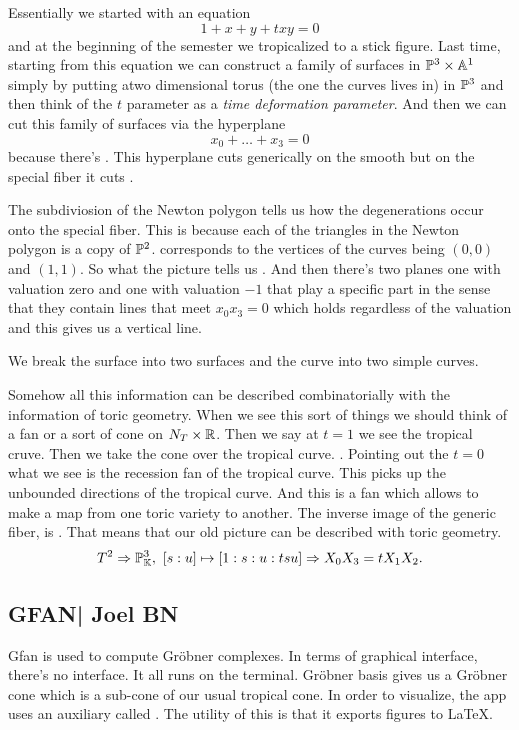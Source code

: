 \documentclass[12pt]{memoir}
\begin{document}
Essentially we started with an equation 
$$1+x+y+txy=0$$
and at the beginning of the semester we tropicalized to a stick figure. Last time, starting from this equation we can construct a family of surfaces in $\mathbb{P}^3\times\mathbb{A}^1$ simply by putting atwo dimensional torus (the one the curves lives in) in $\mathbb{P}^3$ and then think of the $t$ parameter as a \emph{time deformation parameter}.  And then we can cut this family of surfaces via the hyperplane 
$$x_0+\dots+x_3=0$$
because there's . This hyperplane cuts generically on the smooth but on the special fiber it cuts .\par 
The subdiviosion of the Newton polygon tells us how the degenerations occur onto the special fiber. This is because each of the triangles in the Newton polygon is a copy of $\mathbb{P}^2$.  corresponds to the vertices of the curves being $(0,0)$ and $(1,1)$. So what the picture tells us . And then there's two planes one with valuation zero and one with valuation $-1$ that play a specific part in the sense that they contain lines that meet $x_0x_3=0$ which holds regardless of the valuation and this gives us a vertical line.\par 
We break the surface into two surfaces and the curve into two simple curves.\par 
Somehow all this information can be described combinatorially with the information of toric geometry. When we see this sort of things we should think of a fan or a sort of cone on $N_T\times\mathbb{R}$. Then we say at $t=1$ we see the tropical cruve. Then we take the cone over the tropical curve. . Pointing out the $t=0$ what we see is the recession fan of the tropical curve. This picks up the unbounded directions of the tropical curve. And this is a fan which allows to make a map from one toric variety to another. The inverse image of the generic fiber, is . That means that our old picture can be described with toric geometry. 
$$T^2\Rightarrow\mathbb{P}^3_{\mathbb{K}},\ [s:u]\mapsto[1:s:u:tsu] \Rightarrow X_0X_3=tX_1X_2.$$

\subsection{GFAN| Joel BN}

Gfan is used to compute Gr\"obner complexes. In terms of graphical interface, there's no interface. It all runs on the terminal. Gr\"obner basis gives us a Gr\"obner cone which is a sub-cone of our usual tropical cone. In order to visualize, the app uses an auxiliary called . The utility of this is that it exports figures to \LaTeX.
\end{document}
